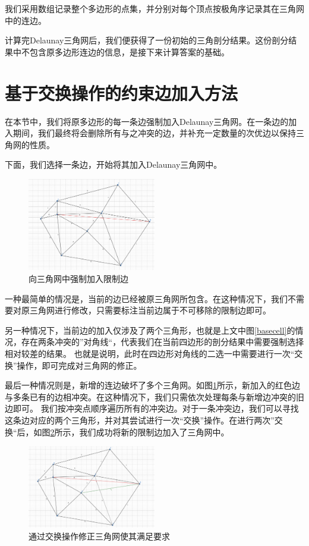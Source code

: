 我们采用数组记录整个多边形的点集，并分别对每个顶点按极角序记录其在三角网中的连边。

计算完Delaunay三角网后，我们便获得了一份初始的三角剖分结果。这份剖分结果中不包含原多边形连边的信息，是接下来计算答案的基础。
\section{基于交换操作的约束边加入方法}
在本节中，我们将原多边形的每一条边强制加入Delaunay三角网。在一条边的加入期间，我们最终将会删除所有与之冲突的边，并补充一定数量的次优边以保持三角网的性质。

下面，我们选择一条边，开始将其加入Delaunay三角网中。

\begin{figure}[htp]
    \centering
    \includegraphics[width=0.5\textwidth]
    {figures/addconstrant.png}
    \caption{向三角网中强制加入限制边}
    \label{addedge}
  \end{figure}

一种最简单的情况是，当前的边已经被原三角网所包含。在这种情况下，我们不需要对原三角网进行修改，只需要标注当前边属于不可移除的限制边即可。

另一种情况下，当前边的加入仅涉及了两个三角形，也就是上文中图\ref*{basecell}的情况，存在两条冲突的”对角线“，代表我们在当前四边形的剖分结果中需要强制选择相对较差的结果。
也就是说明，此时在四边形对角线的二选一中需要进行一次“交换”操作，即可完成对三角网的修正。

最后一种情况则是，新增的连边破坏了多个三角网。如图\ref*{addedge}所示，新加入的红色边与多条已有的边相冲突。在这种情况下，我们只需依次处理每条与新增边冲突的旧边即可。
我们按冲突点顺序遍历所有的冲突边。对于一条冲突边，我们可以寻找这条边对应的两个三角形，并对其尝试进行一次“交换”操作。在进行两次”交换“后，如图\ref*{swap}所示，我们成功将新的限制边加入了三角网中。

\begin{figure}[htp]
    \centering
    \includegraphics[width=0.5\textwidth]
    {figures/swap.png}
    \caption{通过交换操作修正三角网使其满足要求}
    \label{swap}
  \end{figure}


